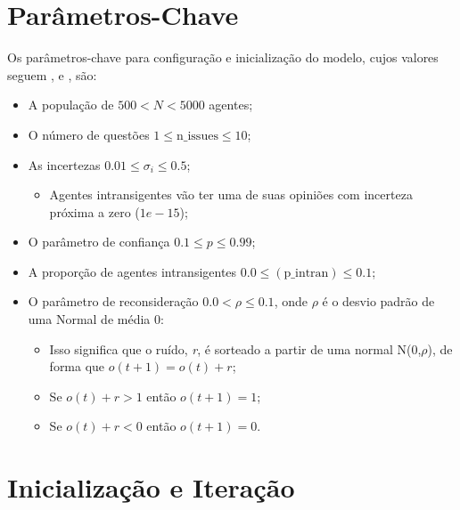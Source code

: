 \section{Parâmetros-Chave}

Os parâmetros-chave para configuração e inicialização do modelo, cujos valores
seguem ,  e
, são:

\begin{itemize}
\item A população de \(500 < N < 5000\) agentes;
\item O número de questões \(1 \leq \text{n\_issues} \leq 10\); 

\item As incertezas \(0.01 \leq \sigma_i \leq 0.5\);
  \begin{itemize}
  \item Agentes intransigentes vão ter uma de suas opiniões com incerteza
    próxima a zero (\(1e-15\));
  \end{itemize}

\item O parâmetro de confiança \(0.1 \leq p \leq 0.99\);
  
\item A proporção de agentes intransigentes \(0.0 \leq (\text{p\_intran}) \leq 0.1\);

\item O parâmetro de reconsideração \(0.0 < \rho  \leq 0.1\), onde \(\rho\) é o desvio
  padrão de uma Normal de média 0:
  \begin{itemize}
  \item Isso significa que o ruído, \textit{r}, é sorteado a partir de uma
    normal N(0,\(\rho\)), de forma que \(o(t+1) = o(t) + r\);
  \item Se \(o(t) + r > 1\) então \(o(t+1) = 1\);
  \item Se \(o(t) + r < 0\) então \(o(t+1) = 0\).
  \end{itemize}
  
\end{itemize}

\section{Inicialização e Iteração}

